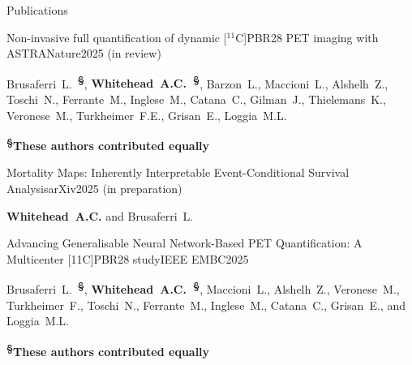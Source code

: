 \documentclass{cv}
\begin{document}
    \begin{spacing}{1.0}
        \begin{rSection}{Publications}
            \item \begin{rSubsection}{Non-invasive full quantification of dynamic [$^{11}$C]PBR28 PET imaging with ASTRA}{}{Nature}{2025 (in review)}
                \item  Brusaferri~L.~\textbf{\textsuperscript{\S}}, \textbf{Whitehead~A.C.~\textsuperscript{\S}}, Barzon~L., Maccioni~L., Alshelh~Z., Toschi~N., Ferrante~M., Inglese~M., Catana~C., Gilman~J., Thielemans~K., Veronese~M., Turkheimer~F.E., Grisan~E., Loggia~M.L. \\
                \vspace{-0.5cm}
                \item \textbf{\textsuperscript{\S}These authors contributed equally} \\
            \end{rSubsection}
            
            \item \begin{rSubsection}{Mortality Maps: Inherently Interpretable Event-Conditional Survival Analysis}{}{arXiv}{2025 (in preparation)}
                \item \textbf{Whitehead~A.C.} and Brusaferri~L. \\
            \end{rSubsection}
            
            \item \begin{rSubsection}{Advancing Generalisable Neural Network-Based PET Quantification: A Multicenter [11C]PBR28 study}{}{IEEE EMBC}{2025}
                \item Brusaferri~L.~\textbf{\textsuperscript{\S}}, \textbf{Whitehead~A.C.~\textsuperscript{\S}}, Maccioni~L., Alshelh~Z., Veronese~M., Turkheimer~F., Toschi~N., Ferrante~M., Inglese~M., Catana~C., Grisan~E., and Loggia~M.L. \\
                \vspace{-0.5cm}
                \item \textbf{\textsuperscript{\S}These authors contributed equally} \\
            \end{rSubsection}
            

\end{rSection}
\end{spacing}
\end{document}
